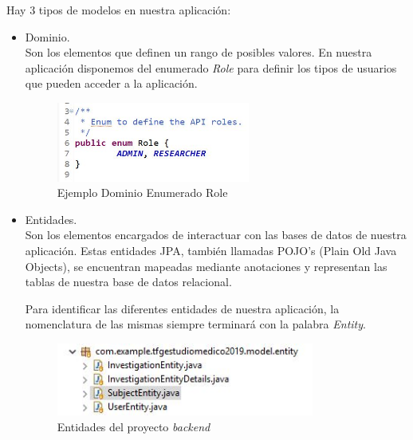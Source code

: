 \begin{itemize}
            Hay 3 tipos de modelos en nuestra aplicación:
            \begin{itemize}
                \item Dominio. \\
                Son los elementos que definen un rango de posibles valores. En nuestra aplicación disponemos del enumerado  \textit{Role} para definir los tipos de usuarios que pueden acceder a la aplicación.
                \newline
                
                 \begin{figure}[h]
                \centering
                \includegraphics[width=0.6\textwidth]{images/role.JPG}
                \caption{Ejemplo Dominio Enumerado Role}
                \end{figure}
                
                 \FloatBarrier
                
              
                \item Entidades.  \\
                Son los elementos encargados de interactuar con las bases de datos de nuestra aplicación. Estas entidades JPA, también llamadas POJO's (Plain Old Java Objects), se encuentran mapeadas mediante anotaciones y representan las tablas de nuestra base de datos relacional.
                \newline
                
                
            Para identificar las diferentes entidades de nuestra aplicación, la nomenclatura de las mismas siempre terminará con la palabra \textit{Entity}.
            \newline
                
                  \begin{figure}[h]
                        \centering
                        \includegraphics[width=0.8\textwidth]{images/entity.JPG}
                        \caption{Entidades del proyecto \textit{backend}}
                    \end{figure}
            

\end{itemize}
\end{itemize}
